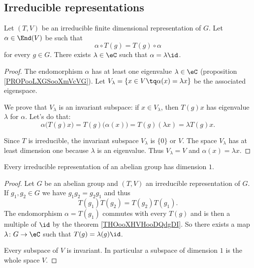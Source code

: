\subsection{Irreducible representations}


\begin{theorem}   \label{THOooXHVHooDQdgDI}
    Let \( (T,V)\) be an irreducible finite dimensional representation of \( G\). Let \( \alpha\in \End(V)\) be such that
    \begin{equation}
        \alpha\circ T(g)=T(g)\circ \alpha
    \end{equation}
    for every \( g\in G\). There exists \( \lambda\in \eC\) such that \( \alpha=\lambda\id\).
\end{theorem}

\begin{proof}
    The endomorphism \( \alpha\) has at least one eigenvalue \( \lambda\in \eC\) (proposition \ref{PROPooLXGSooXmVcVG}). Let \( V_{\lambda}=\{ x\in V\tq \alpha(x)=\lambda x \}\) be the associated eigenspace.

    We prove that \( V_{\lambda}\) is an invariant subspace: if \( x\in V_{\lambda}\), then \( T(g)x\) has eigenvalue \( \lambda\) for \( \alpha\). Let's do that:
    \begin{equation}
        \alpha\big( T(g)x \big)=T(g)\big( \alpha(x) \big)=T(g)(\lambda x)=\lambda T(g)x.
    \end{equation}
    
    Since \( T\) is irreducible, the invariant subspace \( V_{\lambda}\) is \( \{ 0 \}\) or \( V\). The space \( V_{\lambda}\) has at least dimension one because \( \lambda\) is an eigenvalue. Thus \( V_{\lambda}=V\) and \( \alpha(x)=\lambda x\).
\end{proof}

\begin{theorem}       \label{THOooFFJGooCekFQc}
    Every irreducible representation of an abelian group has dimension \( 1\).
\end{theorem}

\begin{proof}
    Let \( G\) be an abelian group and \( (T,V)\) an irreducible representation of \( G\). If \( g_1,g_2\in G\) we have \( g_1g_2=g_2g_1\) and thus
    \begin{equation}
        T(g_1)T(g_2)=T(g_2)T(g_1).
    \end{equation}
    The endomorphism \( \alpha=T(g_1)\) commutes with every \( T(g)\) and is then a multiple of \( \id\) by the theorem \ref{THOooXHVHooDQdgDI}. So there exists a map \( \lambda\colon G\to \eC\) such that \( T(g)=\lambda(g)\id\).

    Every subspace of \( V\) is invariant. In particular a subspace of dimension \( 1\) is the whole space \( V\).
\end{proof}

